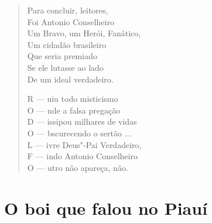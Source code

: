 \begin{verse}
Para concluir, leitores, \\
Foi Antonio Conselheiro \\
Um Bravo, um Herói, Fanático, \\
Um cidadão brasileiro \\
Que seria premiado \\
Se ele lutasse ao lado \\
De um ideal verdadeiro. 


R --- uiu todo misticismo \\
O --- nde a falsa pregação \\
D --- issipou milhares de vidas \\
O --- bscurecendo o sertão ... \\
L --- ivre Deus"-Pai Verdadeiro, \\
F --- indo Antonio Conselheiro \\
O --- utro não apareça, não. 
\end{verse}

\chapter{O boi que falou no Piauí}

